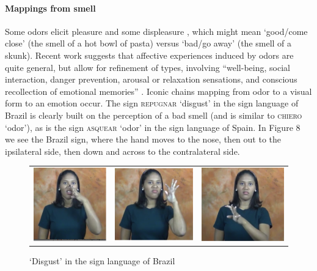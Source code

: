 \documentclass[output=paper,
modfonts
]{LSP/langsci}
\begin{document}
\paragraph{Mappings from smell} Some odors elicit pleasure and some
displeasure \citep{alaoui1997}, which might mean `good/come
close' (the smell of a hot bowl of pasta) versus `bad/go away' (the
smell of a skunk). Recent work suggests that affective experiences
induced by odors are quite general, but allow for refinement of types,
involving ``well-being, social interaction, danger prevention, arousal
or relaxation sensations, and conscious recollection of emotional
memories'' \citep[49]{chrea2009}. Iconic chains mapping from odor to a
visual form to an emotion occur. The sign \textsc{repugnar} `disgust' in
the sign language of Brazil is clearly built on the perception of a bad
smell (and is similar to \textsc{chiero} `odor'), as is the sign
\textsc{asquear} `odor' in the sign language of Spain. In Figure 8 we
see the Brazil sign, where the hand moves to the nose, then out to the
ipsilateral side, then down and across to the contralateral side.

\begin{figure}
	\begin{tabularx}{\textwidth}{CCC}
		\includegraphics{napoli_fig8a} & \includegraphics{napoli_fig8b} & \includegraphics{napoli_fig8c}\\
	\end{tabularx}
	\caption{`Disgust' in the sign language of Brazil}
	\label{fig:8}
\end{figure}
\end{document}
